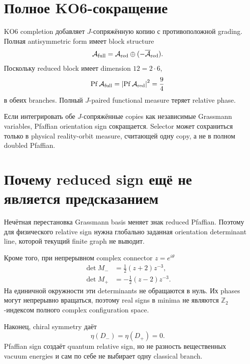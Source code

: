\section{Полное KO6-сокращение}

KO6 completion добавляет \(J\)-сопряжённую копию с противоположной grading.
Полная antisymmetric form имеет block structure
\begin{equation}
 \mathcal A_{\rm full}
 =
 \mathcal A_{\rm red}\oplus(-\overline{\mathcal A}_{\rm red}).
\end{equation}
Поскольку reduced block имеет dimension \(12=2\cdot6\),
\begin{equation}
 \operatorname{Pf}\mathcal A_{\rm full}
 =
 \left|\operatorname{Pf}\mathcal A_{\rm red}\right|^2
 =\frac94
\end{equation}
в обеих branches. Полный \(J\)-paired functional measure теряет relative
phase.

\begin{theorem}
Если интегрировать обе \(J\)-сопряжённые copies как независимые Grassmann
variables, Pfaffian orientation sign сокращается. Selector может сохраниться
только в physical reality-orbit measure, считающей одну copy, а не в полном
doubled Pfaffian.
\end{theorem}

\section{Почему reduced sign ещё не является предсказанием}

Нечётная перестановка Grassmann basis меняет знак reduced Pfaffian. Поэтому
для физического relative sign нужна глобально заданная orientation
determinant line, которой текущий finite graph не выводит.

Кроме того, при непрерывном complex connector \(z=e^{i\theta}\)
\begin{align}
 \det M_-&=\frac12(z+2)z^{-3},\\
 \det M_+&=-\frac12(z-2)z^{-3}.
\end{align}
На единичной окружности эти determinants не обращаются в нуль. Их phases
могут непрерывно вращаться, поэтому real signs в minima не являются
\(\mathbb Z_2\)-индексом полного complex configuration space.

Наконец, chiral symmetry даёт
\begin{equation}
 \eta(D_-)=\eta(D_+)=0.
\end{equation}
Pfaffian sign создаёт quantum relative sign, но не разность вещественных
vacuum energies и сам по себе не выбирает одну classical branch.

